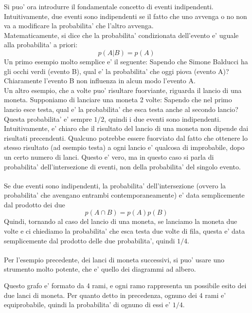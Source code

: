 \documentclass[12pt]{article}
\begin{document}
Si puo' ora introdurre il fondamentale concetto di eventi indipendenti. \\
Intuitivamente, due eventi sono indipendenti se il fatto che uno avvenga o no non va a modificare la probabilita' che l'altro avvenga. \\
Matematicamente, si dice che la probabilita' condizionata dell'evento e' uguale alla probabilita' a priori:
$$	
	p(A|B) = p(A)
$$
Un primo esempio molto semplice e' il seguente: Sapendo che Simone Balducci ha gli occhi verdi (evento B), qual e' la probabilita' che oggi piova (evento A)? Chiaramente l'evento B non influenza in alcun modo l'evento A. \\
Un altro esempio, che a volte puo' risultare fuorviante, riguarda il lancio di una moneta. Supponiamo di lanciare una moneta 2 volte: Sapendo che nel primo lancio esce testa, qual e' la probabilita' che esca testa anche al secondo lancio? Questa probabilita' e' sempre $1/2$, quindi i due eventi sono indipendenti. Intuitivamente, e' chiaro che il risultato del lancio di una moneta non dipende dai risultati precendenti. Qualcuno potrebbe essere fuorviato dal fatto che ottenere lo stesso risultato (ad esempio testa) a ogni lancio e' qualcosa di improbabile, dopo un certo numero di lanci. Questo e' vero, ma in questo caso si parla di probabilita' dell'intersezione di eventi, non della probabilita' del singolo evento. \\ \\
Se due eventi sono indipendenti, la probabilita' dell'intersezione (ovvero la probabilita' che avengano entrambi contemporaneamente) e' data semplicemente dal prodotto dei due
$$
	p(A \cap B) = p(A)p(B)
$$
Quindi, tornando al caso del lancio di una moneta, se lanciamo la moneta due volte e ci chiediamo la probabilita' che esca testa due volte di fila, questa e' data semplicemente dal prodotto delle due probabilita', quindi $1/4$. \\ \\
Per l'esempio precedente, dei lanci di moneta successivi, si puo' usare uno strumento molto potente, che e' quello dei diagrammi ad albero.
\begin{center}
\end{center}
Questo grafo e' formato da 4 rami, e ogni ramo rappresenta un possibile esito dei due lanci di moneta. Per quanto detto in precedenza, ognuno dei 4 rami e' equiprobabile, quindi la probabilita' di ognuno di essi e' $1/4$.
\end{document}
